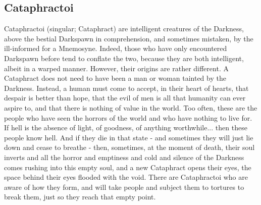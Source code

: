 \subsection*{Cataphractoi}
Cataphractoi (singular; Cataphract) are intelligent creatures of the Darkness, above the bestial Darkspawn in comprehension, and sometimes mistaken, by the ill-informed for a Mnemosyne. Indeed, those who have only encountered Darkspawn before tend to conflate the two, because they are both intelligent, albeit in a warped manner. However, their origins are rather different. A Cataphract does not need to have been a man or woman tainted by the Darkness. Instead, a human must come to accept, in their heart of hearts, that despair is better than hope, that the evil of men is all that humanity can ever aspire to, and that there is nothing of value in the world. Too often, these are the people who have seen the horrors of the world and who have nothing to live for. If hell is the absence of light, of goodness, of anything worthwhile... then these people know hell. And if they die in that state - and sometimes they will just lie down and cease to breathe - then, sometimes, at the moment of death, their soul inverts 
and all the horror and emptiness and cold and silence of the Darkness comes rushing into this empty soul, and a new Cataphract opens their eyes, the space behind their eyes flooded with the void. There are Cataphractoi who are aware of how they form, and will take people and subject them to tortures to break them, just so they reach that empty point.

